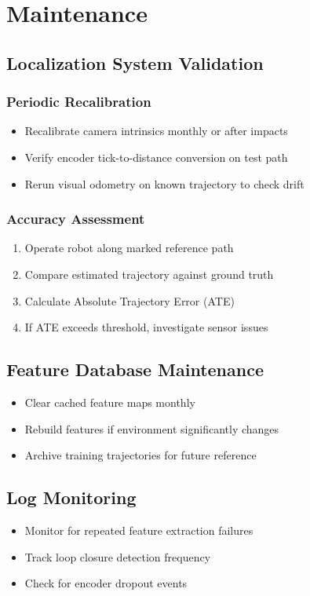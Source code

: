 %
%

\chapter{Maintenance}

\section{Localization System Validation}

\subsection{Periodic Recalibration}
\begin{itemize}
    \item Recalibrate camera intrinsics monthly or after impacts
    \item Verify encoder tick-to-distance conversion on test path
    \item Rerun visual odometry on known trajectory to check drift
\end{itemize}

\subsection{Accuracy Assessment}
\begin{enumerate}
    \item Operate robot along marked reference path
    \item Compare estimated trajectory against ground truth
    \item Calculate Absolute Trajectory Error (ATE)
    \item If ATE exceeds threshold, investigate sensor issues
\end{enumerate}

\section{Feature Database Maintenance}

\begin{itemize}
    \item Clear cached feature maps monthly
    \item Rebuild features if environment significantly changes
    \item Archive training trajectories for future reference
\end{itemize}

\section{Log Monitoring}

\begin{itemize}
    \item Monitor for repeated feature extraction failures
    \item Track loop closure detection frequency
    \item Check for encoder dropout events
\end{itemize}





